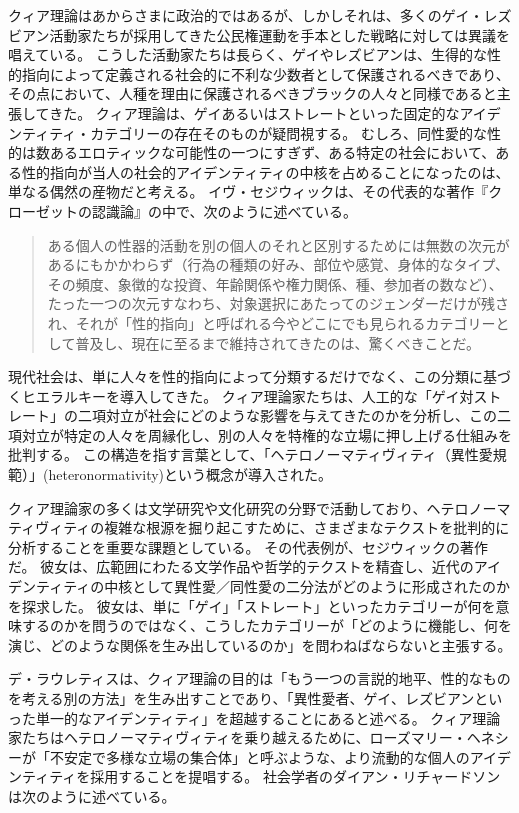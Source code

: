\documentclass[paper=a4,book,openany]{jlreq} \usepackage{mystyle}
\begin{document}
クィア理論はあからさまに政治的ではあるが、しかしそれは、多くのゲイ・レズビアン活動家たちが採用してきた公民権運動を手本とした戦略に対しては異議を唱えている。
こうした活動家たちは長らく、ゲイやレズビアンは、生得的な性的指向によって定義される社会的に不利な少数者として保護されるべきであり、その点において、人種を理由に保護されるべきブラックの人々と同様であると主張してきた。
クィア理論は、ゲイあるいはストレートといった固定的なアイデンティティ・カテゴリーの存在そのものが疑問視する。
むしろ、同性愛的な性的は数あるエロティックな可能性の一つにすぎず、ある特定の社会において、ある性的指向が当人の社会的アイデンティティの中核を占めることになったのは、単なる偶然の産物だと考える。
イヴ・セジウィックは、その代表的な著作『クローゼットの認識論』の中で、次のように述べている。

\begin{quote}
  ある個人の性器的活動を別の個人のそれと区別するためには無数の次元があるにもかかわらず（行為の種類の好み、部位や感覚、身体的なタイプ、その頻度、象徴的な投資、年齢関係や権力関係、種、参加者の数など）、たった一つの次元{\DDASH}すなわち、対象選択にあたってのジェンダー{\DDASH}だけが残され、それが「性的指向」と呼ばれる今やどこにでも見られるカテゴリーとして普及し、現在に至るまで維持されてきたのは、驚くべきことだ。
\citep{sedgwick90:_epist_closet}

\end{quote}

現代社会は、単に人々を性的指向によって分類するだけでなく、この分類に基づくヒエラルキーを導入してきた。
クィア理論家たちは、人工的な「ゲイ対ストレート」の二項対立が社会にどのような影響を与えてきたのかを分析し、この二項対立が特定の人々を周縁化し、別の人々を特権的な立場に押し上げる仕組みを批判する。
この構造を指す言葉として、「ヘテロノーマティヴィティ（異性愛規範）」(heteronormativity)という概念が導入された\citep{warner91:_introd}。

クィア理論家の多くは文学研究や文化研究の分野で活動しており、ヘテロノーマティヴィティの複雑な根源を掘り起こすために、さまざまなテクストを批判的に分析することを重要な課題としている。
その代表例が、セジウィックの著作だ。
彼女は、広範囲にわたる文学作品や哲学的テクストを精査し、近代のアイデンティティの中核として異性愛／同性愛の二分法がどのように形成されたのかを探求した。
彼女は、単に「ゲイ」「ストレート」といったカテゴリーが何を意味するのかを問うのではなく、こうしたカテゴリーが「どのように機能し、何を演じ、どのような関係を生み出しているのか」を問わねばならないと主張する\citep[p.27]{sedgwick90:_epist_closet}。

デ・ラウレティスは、クィア理論の目的は「もう一つの言説的地平、性的なものを考える別の方法」を生み出すことであり、「異性愛者、ゲイ、レズビアンといった単一的なアイデンティティ」を超越することにあると述べる\citep[p.iv]{lauretis91:_diff}。
クィア理論家たちはヘテロノーマティヴィティを乗り越えるために、ローズマリー・ヘネシーが「不安定で多様な立場の集合体」と呼ぶような、より流動的な個人のアイデンティティを採用することを提唱する\citep[p.965]{hennessy93:_queer_theor}。
社会学者のダイアン・リチャードソンは次のように述べている。
\end{document}
